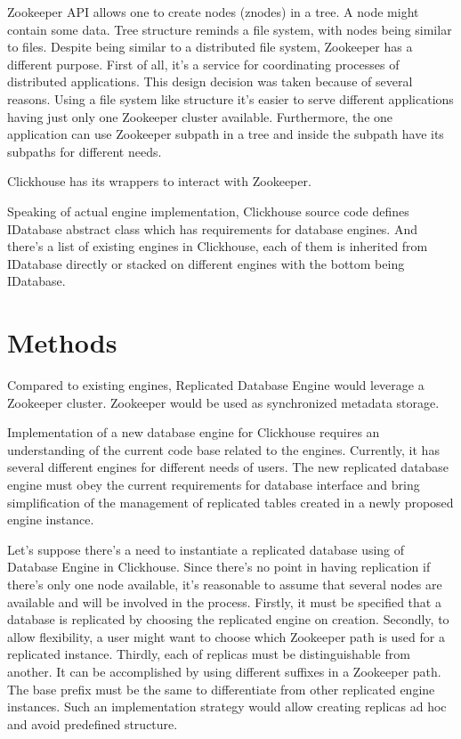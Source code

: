 \documentclass[conference]{IEEEtran}
\begin{document}
Zookeeper API allows one to create nodes (znodes) in a tree. A node might contain some data.
Tree structure reminds a file system, with nodes being similar to files.
Despite being similar to a distributed file system, Zookeeper has a different purpose.
First of all, it's a service for coordinating processes of distributed applications.
This design decision was taken because of several reasons. Using a file system like
structure it's easier to serve different applications having just only one Zookeeper cluster
available. Furthermore, the one application can use Zookeeper subpath in a tree
and inside the subpath have its subpaths for different needs.

Clickhouse has its wrappers to interact with Zookeeper.

Speaking of actual engine implementation, Clickhouse source code\cite{clickhouse}
defines IDatabase abstract class which has
requirements for database engines. And there's a list of existing engines in Clickhouse, each
of them is inherited from IDatabase directly or stacked on different engines with the
bottom being IDatabase.

\section{Methods}

Compared to existing engines, Replicated Database Engine
would leverage a Zookeeper cluster. Zookeeper would be used as synchronized
metadata storage.

Implementation of a new database engine for Clickhouse requires an understanding of
the current code base related to the engines. Currently, it has several different
engines for different needs of users. The new replicated database engine must
obey the current requirements for database interface and bring simplification
of the management of replicated tables created in a newly proposed engine instance.

Let's suppose there's a need to instantiate a replicated database using
of Database Engine in Clickhouse. Since there's no point in having replication
if there's only one node available, it's reasonable to assume that several nodes are
available and will be involved in the process. Firstly, it must be specified that
a database is replicated by choosing the replicated engine on creation. Secondly,
to allow flexibility, a user might want to choose which Zookeeper path is used for a
replicated instance. Thirdly, each of replicas must be distinguishable from another.
It can be accomplished by using different suffixes in a Zookeeper path. The base prefix
must be the same to differentiate from other replicated engine instances.
Such an implementation strategy would allow creating replicas ad hoc and avoid
predefined structure.
\end{document}
